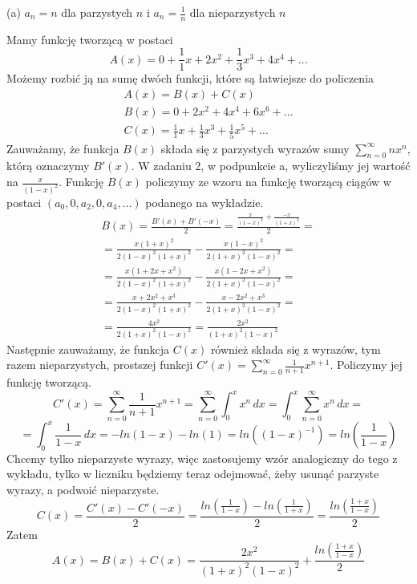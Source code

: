 \documentclass[12pt,a4paper]{article}
\begin{document}
(a) \(a_n = n\) dla parzystych \(n\) i \(a_n = \frac{1}{n} \) dla nieparzystych \(n\)

Mamy funkcję tworzącą w postaci
\[
	A(x) = 0 + \frac{1}{1}x + 2x^2 + \frac{1}{3}x^3 + 4x^4 + ...
\]
Możemy rozbić ją na sumę dwóch funkcji, które są łatwiejsze do policzenia
\begin{gather*}
	A(x) = B(x) + C(x) \\
	B(x) = 0 + 2x^2 + 4x^4 + 6x^6 + ... \\
	C(x) = \frac{1}{1}x + \frac{1}{3}x^3 + \frac{1}{5}x^5 + ...
\end{gather*}
Zauważamy, że funkcja \(B(x)\) składa się z parzystych wyrazów sumy \( \sum_{n=0}^\infty nx^n \), którą oznaczymy \( B'(x) \). W zadaniu 2, w podpunkcie a, wyliczyliśmy jej wartość na \(\frac{x}{(1-x)^2} \). Funkcję \( B(x)\) policzymy ze wzoru na funkcję tworzącą ciągów w postaci \( (a_0,0,a_2,0,a_4,...) \) podanego na wykładzie.
\begin{gather*}
	B(x) = \frac{B'(x) + B'(-x)}{2} = \frac{ \frac{x}{(1-x)^2} + \frac{-x}{(1+x)^2}}{2} = \\
	= \frac{x(1+x)^2}{2(1-x)^2(1+x)^2} - \frac{x(1-x)^2}{2(1+x)^2(1-x)^2} = \\
	= \frac{x(1+2x+x^2)}{2(1-x)^2(1+x)^2} - \frac{x(1-2x+x^2)}{2(1+x)^2(1-x)^2} = \\
	= \frac{x+2x^2+x^3}{2(1-x)^2(1+x)^2} - \frac{x-2x^2+x^3}{2(1+x)^2(1-x)^2} = \\
	= \frac{4x^2}{2(1+x)^2(1-x)^2} = \frac{2x^2}{(1+x)^2(1-x)^2}
\end{gather*}
Następnie zauważamy, że funkcja \(C(x)\) również składa się z wyrazów, tym razem nieparzystych, prostszej funkcji \(C'(x) = \sum_{n=0}^\infty \frac{1}{n+1}x^{n+1}\). Policzymy jej funkcję tworzącą.
\[
	C'(x) = \sum_{n=0}^\infty \frac{1}{n+1}x^{n+1} 
	= \sum_{n=0}^\infty \int_0^x x^n \,dx 
	= \int_0^x \sum_{n=0}^\infty x^n \,dx =
\]
\[
	= \int_0^x \frac{1}{1-x} \,dx 
	= -ln(1-x) - ln(1) 
	= ln((1-x)^{-1}) 
	= ln\left( \frac{1}{1-x} \right) 
\]
Chcemy tylko nieparzyste wyrazy, więc zastosujemy wzór analogiczny do tego z wykładu, tylko w liczniku będziemy teraz odejmować, żeby usunąć parzyste wyrazy, a podwoić nieparzyste.
\[
	C(x) = \frac{C'(x) - C'(-x)}{2}	 = \frac{ln\left( \frac{1}{1-x} \right) 
	- ln\left( \frac{1}{1+x} \right) }{2}
	= \frac{ ln\left( \frac{1+x}{1-x} \right) }{2}
\]
Zatem
\[
	A(x) = B(x) + C(x) = \frac{2x^2}{(1+x)^2(1-x)^2} + \frac{ ln\left( \frac{1+x}{1-x} \right) }{2}
\]
\end{document}
